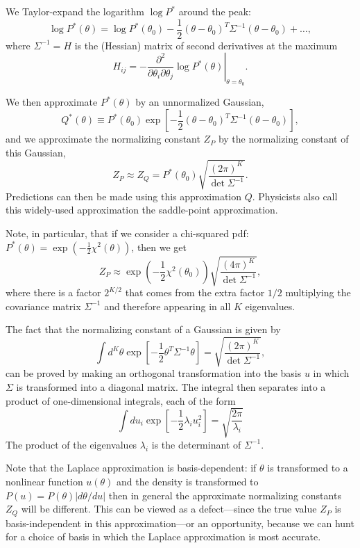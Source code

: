 \documentclass[%
oneside,                 %
final,                   %
10pt]{article}
\begin{document}
We Taylor-expand the logarithm $\log P^*$ around the peak:
$$
\log P^*(\theta) = \log P^*(\theta_0) - \frac{1}{2} (\theta - \theta_0)^T \Sigma^{-1} (\theta - \theta_0) + \ldots,
$$
where $\Sigma^{-1} = H$ is the (Hessian) matrix of second derivatives at the maximum
$$
H_{ij} = - \left. \frac{\partial^2}{\partial \theta_i \partial \theta_j}  \log P^*(\theta)\right|_{\theta=\theta_0}.
$$

We then approximate $P^*(\theta)$ by an unnormalized Gaussian, 
$$
Q^*(\theta) \equiv P^*(\theta_0) \exp \left[ - \frac{1}{2}(\theta - \theta_0)^T \Sigma^{-1} (\theta - \theta_0) \right],
$$
and we approximate the normalizing constant $Z_P$ by the normalizing constant
of this Gaussian,
$$
Z_P \approx Z_Q = P^*(\theta_0) \sqrt{\frac{(2\pi)^K}{\det\Sigma^{-1}}}.
$$
Predictions can then be made using this approximation $Q$. Physicists also call this widely-used approximation the saddle-point approximation.

Note, in particular, that if we consider a chi-squared pdf: $P^*(\theta) = \exp \left( -\frac{1}{2} \chi^2(\theta)\right)$, then we get
$$
Z_P \approx \exp \left( -\frac{1}{2} \chi^2(\theta_0)\right) \sqrt{\frac{(4\pi)^K}{\det\Sigma^{-1}}},
$$
where there is a factor $2^{K/2}$ that comes from the extra factor $1/2$ multiplying the covariance matrix $\Sigma^{-1}$ and therefore appearing in all $K$ eigenvalues.

The fact that the normalizing constant of a Gaussian is given by 
$$
\int d^K\theta \exp \left[ - \frac{1}{2}\theta^T \Sigma^{-1} \theta \right] = \sqrt{\frac{(2\pi)^K}{\det\Sigma^{-1}}},
$$
can be proved by making an orthogonal transformation into the basis $u$ in which $\Sigma$ is transformed into a diagonal matrix. The integral then separates into a product of one-dimensional integrals, each of the form
$$
\int du_i \exp \left[ -\frac{1}{2} \lambda_i u_i^2 \right] = \sqrt{\frac{2\pi}{\lambda_i}}
$$
The product of the eigenvalues $\lambda_i$ is the determinant of $\Sigma^{-1}$.

Note that the Laplace approximation is basis-dependent: if $\theta$ is transformed to a nonlinear function $u(\theta)$ and the density is transformed to $P(u) = P(\theta) |d\theta/du|$ then in general the approximate normalizing constants $Z_Q$ will be different. This can be viewed as a defect---since the true value $Z_P$ is basis-independent in this approximation---or an opportunity, because we can hunt for a choice of basis in which the Laplace approximation is most accurate.



\end{document}
